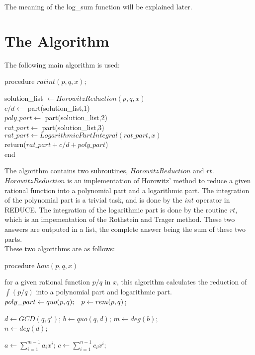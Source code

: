 The meaning of the log\_sum function will be explained later.
\pagebreak
\section{The Algorithm}
The following main algorithm is used:

procedure $ratint(p,q,x);$


    solution\_list $\leftarrow HorowitzReduction(p,q,x)$ 
 \\
    $c/d \leftarrow$ part(solution\_list,1)\\  
    $poly\_part \leftarrow$ part(solution\_list,2)
  \\
    $rat\_part \leftarrow$ part(solution\_list,3)
\\
    $rat\_part \leftarrow LogarithmicPartIntegral(rat\_part,x) $
\\
 return($rat\_part+c/d +poly\_part$)
\\
end

The algorithm contains two subroutines, $HorowitzReduction$ and $rt$. $HorowitzReduction$ is an implementation of Horowitz' method to reduce a given rational function into a polynomial part and a logarithmic part. The integration of the polynomial part is a trivial task, and is done by the $int$ operator in \small{REDUCE}. The integration of the logarithmic part is done by the routine $rt$, which is an impementation of the Rothstein and Trager method. These two answers are outputed in a list, the complete answer being the sum of these two parts.
\\
These two algorithms are as follows:

procedure $how(p,q,x)$

for a given rational function $p/q$ in $x$, this algorithm calculates the
reduction of $ \int(p/q)$ into a polynomial part and logarithmic part. \\

$ poly\_part \leftarrow quo(p,q); \hspace{3 mm}  p \leftarrow rem(p,q)$;

$d \leftarrow GCD(q,q') $; \hspace{3 mm}    $b \leftarrow quo(q,d)$; \hspace{3 mm}
$m \leftarrow deg(b)$; \\  $n \leftarrow deg(d)$;

$a \leftarrow  \sum_{i=1}^{m-1} a_{i}x^{i}$; \hspace{3 mm}
   $ c \leftarrow \sum_{i=1}^{n-1} c_{i}x^{i}$; \\ 

